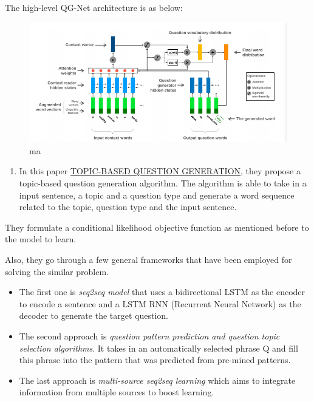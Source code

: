 \documentclass{acm_proc_article-sp}
\providecommand{\tightlist}{%
  \setlength{\itemsep}{0pt}\setlength{\parskip}{0pt}}
\begin{document}
The high-level QG-Net architecture is as below:

\begin{figure}
\centering
\includegraphics{img/qgnet.png}
\caption{ma}
\end{figure}

\begin{enumerate}
\def\labelenumi{\arabic{enumi}.}
\setcounter{enumi}{1}
\tightlist
\item
  In this paper
  \href{https://openreview.net/pdf?id=rk3pnae0b}{TOPIC-BASED QUESTION
  GENERATION}, they propose a topic-based question generation algorithm.
  The algorithm is able to take in a input sentence, a topic and a
  question type and generate a word sequence related to the topic,
  question type and the input sentence.
\end{enumerate}

They formulate a conditional likelihood objective function as mentioned
before to the model to learn.

Also, they go through a few general frameworks that have been employed
for solving the similar problem.

\begin{itemize}
\item
  The first one is \emph{seq2seq model} that uses a bidirectional LSTM
  as the encoder to encode a sentence and a LSTM RNN (Recurrent Neural
  Network) as the decoder to generate the target question.
\item
  The second approach is \emph{question pattern prediction and question
  topic selection algorithms}. It takes in an automatically selected
  phrase Q and fill this phrase into the pattern that was predicted from
  pre-mined patterns.
\item
  The last approach is \emph{multi-source seq2seq learning} which aims
  to integrate information from multiple sources to boost learning.
\end{itemize}
\end{document}
